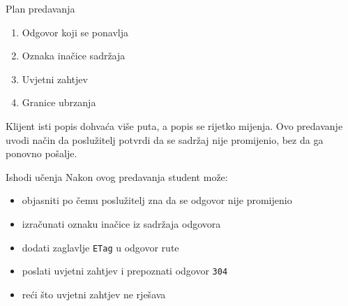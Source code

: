 
\begin{frame}{Plan predavanja}
\begin{enumerate}
  \item Odgovor koji se ponavlja
  \item Oznaka inačice sadržaja
  \item Uvjetni zahtjev
  \item Granice ubrzanja
\end{enumerate}

\vspace{0.6em}
Klijent isti popis dohvaća više puta, a popis se rijetko mijenja. Ovo predavanje uvodi način da poslužitelj potvrdi da se sadržaj nije promijenio, bez da ga ponovno pošalje.
\end{frame}

\begin{frame}{Ishodi učenja}
Nakon ovog predavanja student može:

\begin{itemize}
  \item objasniti po čemu poslužitelj zna da se odgovor nije promijenio
  \item izračunati oznaku inačice iz sadržaja odgovora
  \item dodati zaglavlje \texttt{ETag} u odgovor rute
  \item poslati uvjetni zahtjev i prepoznati odgovor \texttt{304}
  \item reći što uvjetni zahtjev ne rješava
\end{itemize}
\end{frame}

